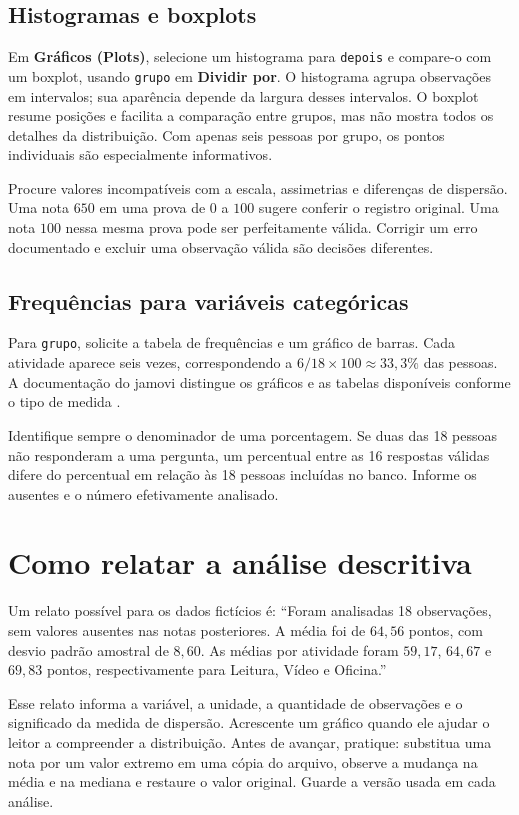 \subsection{Histogramas e boxplots}

Em \textbf{Gráficos (Plots)}, selecione um histograma para \texttt{depois} e compare-o com um boxplot, usando \texttt{grupo} em \textbf{Dividir por}. O histograma agrupa observações em intervalos; sua aparência depende da largura desses intervalos. O boxplot resume posições e facilita a comparação entre grupos, mas não mostra todos os detalhes da distribuição. Com apenas seis pessoas por grupo, os pontos individuais são especialmente informativos.

Procure valores incompatíveis com a escala, assimetrias e diferenças de dispersão. Uma nota $650$ em uma prova de $0$ a $100$ sugere conferir o registro original. Uma nota $100$ nessa mesma prova pode ser perfeitamente válida. Corrigir um erro documentado e excluir uma observação válida são decisões diferentes.

\subsection{Frequências para variáveis categóricas}

Para \texttt{grupo}, solicite a tabela de frequências e um gráfico de barras. Cada atividade aparece seis vezes, correspondendo a $6/18\times100\approx33{,}3\%$ das pessoas. A documentação do jamovi distingue os gráficos e as tabelas disponíveis conforme o tipo de medida \parencite{JamoviDescritivas}.

Identifique sempre o denominador de uma porcentagem. Se duas das 18 pessoas não responderam a uma pergunta, um percentual entre as 16 respostas válidas difere do percentual em relação às 18 pessoas incluídas no banco. Informe os ausentes e o número efetivamente analisado.

\section{Como relatar a análise descritiva}

Um relato possível para os dados fictícios é: ``Foram analisadas 18 observações, sem valores ausentes nas notas posteriores. A média foi de $64{,}56$ pontos, com desvio padrão amostral de $8{,}60$. As médias por atividade foram $59{,}17$, $64{,}67$ e $69{,}83$ pontos, respectivamente para Leitura, Vídeo e Oficina.''

Esse relato informa a variável, a unidade, a quantidade de observações e o significado da medida de dispersão. Acrescente um gráfico quando ele ajudar o leitor a compreender a distribuição. Antes de avançar, pratique: substitua uma nota por um valor extremo em uma cópia do arquivo, observe a mudança na média e na mediana e restaure o valor original. Guarde a versão usada em cada análise.

